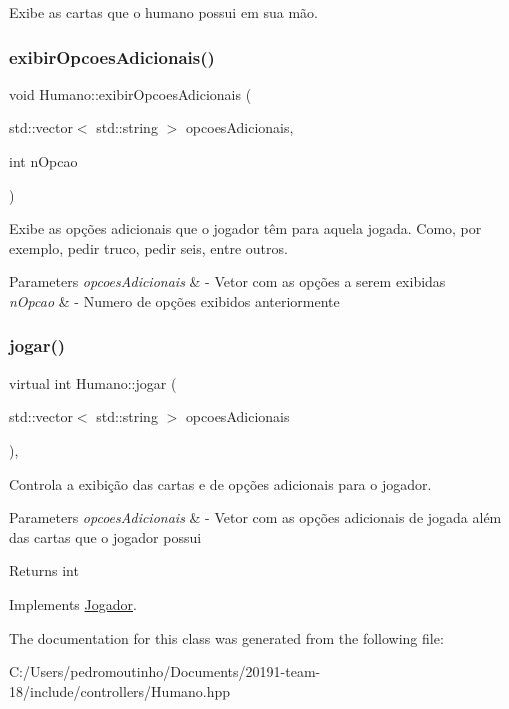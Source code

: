 Exibe as cartas que o humano possui em sua mão. 

\mbox{\label{class_humano_a9be2c952d918117be73a00f2c538834c}} 
\subsubsection{\texorpdfstring{exibirOpcoesAdicionais()}{exibirOpcoesAdicionais()}}
{\footnotesize\ttfamily void Humano\+::exibir\+Opcoes\+Adicionais (\begin{DoxyParamCaption}\item[{std\+::vector$<$ std\+::string $>$}]{opcoes\+Adicionais,  }\item[{int}]{n\+Opcao }\end{DoxyParamCaption})}



Exibe as opções adicionais que o jogador têm para aquela jogada. Como, por exemplo, pedir truco, pedir seis, entre outros. 


\begin{DoxyParams}{Parameters}
{\em opcoes\+Adicionais} & -\/ Vetor com as opções a serem exibidas \\
\hline
{\em n\+Opcao} & -\/ Numero de opções exibidos anteriormente \\
\hline
\end{DoxyParams}
\mbox{\label{class_humano_aad706f019b99747f9c49d915f678998d}} 
\subsubsection{\texorpdfstring{jogar()}{jogar()}}
{\footnotesize\ttfamily virtual int Humano\+::jogar (\begin{DoxyParamCaption}\item[{std\+::vector$<$ std\+::string $>$}]{opcoes\+Adicionais }\end{DoxyParamCaption})\hspace{0.3cm}{\ttfamily [override]}, {\ttfamily [virtual]}}



Controla a exibição das cartas e de opções adicionais para o jogador. 


\begin{DoxyParams}{Parameters}
{\em opcoes\+Adicionais} & -\/ Vetor com as opções adicionais de jogada além das cartas que o jogador possui \\
\hline
\end{DoxyParams}
\begin{DoxyReturn}{Returns}
int 
\end{DoxyReturn}


Implements \mbox{\hyperlink{class_jogador}{Jogador}}.



The documentation for this class was generated from the following file\+:\begin{DoxyCompactItemize}
\item 
C\+:/\+Users/pedromoutinho/\+Documents/20191-\/team-\/18/include/controllers/Humano.\+hpp\end{DoxyCompactItemize}
